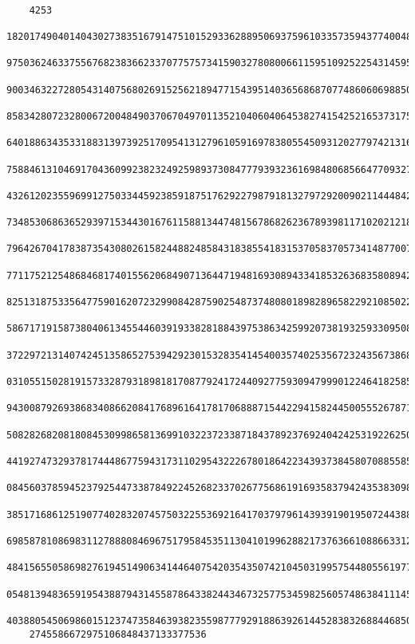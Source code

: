 \documentclass[11pt,twoside,openany]{memoir}
\begin{document}
\begin{tcolorbox}
\begin{Verbatim}[fontsize=\tiny]
    
    4253
    18201749040140430273835167914751015293362889506937596103357359437740048438463485836303232258902400875568993809
    97503624633755676823836623370775757341590327808006611595109252254314595201311901034040809988183597559097583549
    90034632272805431407568026915256218947715439514036568687077486060698850950363352835285818130886516538330890527
    85834280723280067200484903706704970113521040604064538274154252165373175595605248628998615687866235395077520314
    64018863435331883139739251709541312796105916978380554509312027797421316179271275018923497362285350762492463668
    75884613104691704360992382324925989373084777939323616984806856647709327154304910076626824051630447651079961643
    43261202355969912750334459238591875176292279879181327972920090211444842306766331109269166235125509668704478958
    73485306863652939715344301676115881344748156786826236789398117102021218979251408614809021518994770421240728268
    79642670417838735430802615824488248584318385541831537058370573414877007277315509978962393304774712632307264848
    77117521254868468174015562068490713644719481693089433418532636835808942200716440819313366362403191355576523173
    82513187533564775901620723299084287590254873748080189828965822921085022169566342164961172957724520849087789794
    58671719158738040613455446039193382818843975386342599207381932593309508379238236154113045435992906413307967546
    37229721314074245135865275394292301532835414540035740253567232435673868968242806554916467387945199026147468808
    03105515028191573328793189818170877924172440927759309479990122464182585018328148097598880175101690195898881484
    94300879269386834086620841768961641781706888715442294158244500555267871487153652141423726928967889027616798109
    50828268208180845309986581369910322372338718437892376924042425319226250711104694125177110946650435829229609212
    44192747329378174448677594317311029543222678018642234393738458070885585226941701238761458388486661323687510130
    08456037859452379254473387849224526823370267756861916935837942435383098138748060834393941168324721018840749361
    38517168612519077402832074575032255369216417037979614393919019507244388546924316787128440250098924928769352393
    69858781086983112788808469675179584535113041019962882173763661088663312071445862384678494836240920833041626814
    48415655058698276194514906341446407542035435074210450319957544805561977638552139874764379909521730060555030173
    05481394836591954388794314558786433824434673257753459825605748638411145315395326160048592155490496363095590187
    40388054506986015123747358463938235598777929188639261445283832688446850085344842062348224084107820270500410117
    2745586672975106848437133377536
    

\end{Verbatim}
\end{tcolorbox}
\end{document}
